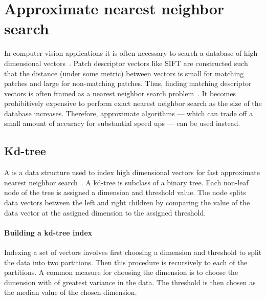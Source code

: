     \section{Approximate nearest neighbor search}\label{sec:ann}  

        In computer vision applications it is often necessary to search
          a database of high dimensional
          vectors~\cite{shakhnarovich_nearestneighbor_2006,
          datar_localitysensitive_2004, muja_fast_2009,
          kulis_kernelized_2012, weiss_spectral_2009}.
        Patch descriptor vectors like SIFT are constructed such that
          the distance (under some metric) between vectors is small for
          matching patches and large for non-matching patches.
        Thus, finding matching descriptor vectors is often framed as a
          nearest neighbor search problem~\cite{lowe_distinctive_2004}.
        It becomes prohibitively expensive to perform exact nearest
          neighbor search as the size of the database increases.
        Therefore, approximate algorithms --- which can trade off a
          small amount of accuracy for substantial speed ups --- can be
          used instead.

        \subsection{Kd-tree}

            A  is a data structure used to index
              high dimensional vectors for fast approximate nearest
              neighbor search~\cite{bentley_multidimensional_1975}.
            A kd-tree is subclass of a binary tree.
            Each non-leaf node of the tree is assigned a dimension and
              threshold value.
            The node splits data vectors between the left and right
              children by comparing the value of the data vector at the
              assigned dimension to the assigned threshold.

            \paragraph{Building a kd-tree index}
            Indexing a set of vectors involves first choosing a
              dimension and threshold to split the data into two
              partitions.
            Then this procedure is recursively to each of the
              partitions.
            A common measure for choosing the dimension is to choose
              the dimension with of greatest variance in the data.
            The threshold is then chosen as the median value of the
              chosen dimension.

